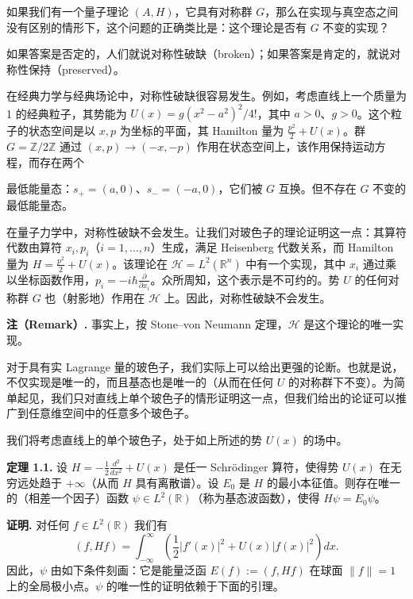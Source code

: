 如果我们有一个量子理论 $(A,H)$，它具有对称群 $G$，那么在实现与真空态之间没有区别的情形下，这个问题的正确类比是：这个理论是否有 $G$ 不变的实现？

如果答案是否定的，人们就说对称性破缺（broken）；如果答案是肯定的，就说对称性保持（preserved）。

在经典力学与经典场论中，对称性破缺很容易发生。例如，考虑直线上一个质量为 1 的经典粒子，其势能为 $U(x)=g(x^2-a^2)^2/4!$，其中 $a>0$、$g>0$。这个粒子的状态空间是以 $x,p$ 为坐标的平面，其 Hamilton 量为 $\frac{p^2}{2}+U(x)$。群 $G=\mathbb{Z}/2\mathbb{Z}$ 通过 $(x,p)\to(-x,-p)$ 作用在状态空间上，该作用保持运动方程，而存在两个

最低能量态：$s_+=(a,0)$、$s_-=(-a,0)$，它们被 $G$ 互换。但不存在 $G$ 不变的最低能量态。

在量子力学中，对称性破缺不会发生。让我们对玻色子的理论证明这一点：其算符代数由算符 $x_i,p_i$（$i=1,\dots,n$）生成，满足 Heisenberg 代数关系，而 Hamilton 量为 $H=\frac{p^2}{2}+U(x)$。该理论在 $\mathcal{H}=L^2(\mathbb{R}^n)$ 中有一个实现，其中 $x_i$ 通过乘以坐标函数作用，$p_i=-i\hbar\frac{\partial}{\partial x_i}$。众所周知，这个表示是不可约的。势 $U$ 的任何对称群 $G$ 也（射影地）作用在 $\mathcal{H}$ 上。因此，对称性破缺不会发生。

\textbf{注（Remark）.}
事实上，按 Stone–von Neumann 定理，$\mathcal{H}$ 是这个理论的唯一实现。

对于具有实 Lagrange 量的玻色子，我们实际上可以给出更强的论断。也就是说，不仅实现是唯一的，而且基态也是唯一的（从而在任何 $U$ 的对称群下不变）。为简单起见，我们只对直线上单个玻色子的情形证明这一点，但我们给出的论证可以推广到任意维空间中的任意多个玻色子。

我们将考虑直线上的单个玻色子，处于如上所述的势 $U(x)$ 的场中。

\textbf{定理 1.1.}
设 $H=-\frac12\frac{d^2}{dx^2}+U(x)$ 是任一 Schrödinger 算符，使得势 $U(x)$ 在无穷远处趋于 $+\infty$（从而 $H$ 具有离散谱）。设 $E_0$ 是 $H$ 的最小本征值。则存在唯一的（相差一个因子）函数 $\psi\in L^2(\mathbb{R})$（称为基态波函数），使得 $H\psi=E_0\psi$。

\textbf{证明.}
对任何 $f\in L^2(\mathbb{R})$ 我们有
\begin{equation}
  \tag{1.1}
  \label{eq:1-1}
  (f,Hf)=\int_{-\infty}^{\infty}\left(\frac12|f'(x)|^2+U(x)|f(x)|^2\right)dx.
\end{equation}
因此，$\psi$ 由如下条件刻画：它是能量泛函 $E(f):=(f,Hf)$ 在球面 $\|f\|=1$ 上的全局极小点。$\psi$ 的唯一性的证明依赖于下面的引理。

